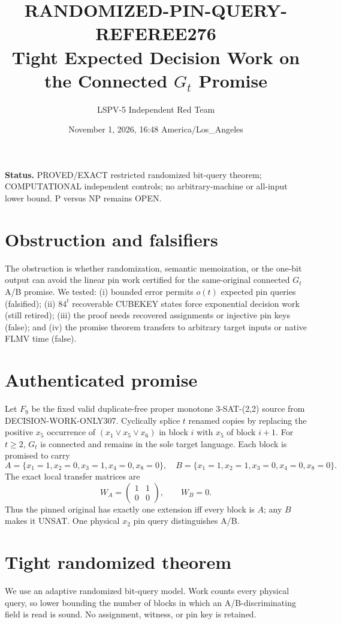 \documentclass[11pt]{article}
\title{RANDOMIZED-PIN-QUERY-REFEREE276\\
\large Tight Expected Decision Work on the Connected $G_t$ Promise}
\author{LSPV-5 Independent Red Team}
\date{November 1, 2026, 16:48 America/Los\_Angeles}
\begin{document}
\maketitle

\noindent\textbf{Status.} PROVED/EXACT restricted randomized bit-query theorem;
COMPUTATIONAL independent controls; no arbitrary-machine or all-input lower
bound. P versus NP remains OPEN.

\section{Obstruction and falsifiers}
The obstruction is whether randomization, semantic memoization, or the one-bit
output can avoid the linear pin work certified for the same-original connected
$G_t$ A/B promise. We tested: (i) bounded error permits $o(t)$ expected pin
queries (falsified); (ii) $84^t$ recoverable CUBEKEY states force exponential
decision work (still retired); (iii) the proof needs recovered assignments or
injective pin keys (false); and (iv) the promise theorem transfers to arbitrary
target inputs or native FLMV time (false).

\section{Authenticated promise}
Let $F_9$ be the fixed valid duplicate-free proper monotone 3-SAT-(2,2)
source from DECISION-WORK-ONLY307. Cyclically splice $t$ renamed copies by
replacing the positive $x_5$ occurrence of $(x_1\vee x_5\vee x_6)$ in block
$i$ with $x_5$ of block $i+1$. For $t\ge2$, $G_t$ is connected and remains
in the sole target language. Each block is promised to carry
\[
A=\{x_1=1,x_2=0,x_3=1,x_4=0,x_8=0\},\quad
B=\{x_1=1,x_2=1,x_3=0,x_4=0,x_8=0\}.
\]
The exact local transfer matrices are
\[
W_A=\begin{pmatrix}1&1\\0&0\end{pmatrix},\qquad W_B=0.
\]
Thus the pinned original has exactly one extension iff every block is $A$;
any $B$ makes it UNSAT. One physical $x_2$ pin query distinguishes A/B.

\section{Tight randomized theorem}
We use an adaptive randomized bit-query model. Work counts every physical
query, so lower bounding the number of blocks in which an A/B-discriminating
field is read is sound. No assignment, witness, or pin key is retained.
\end{document}
